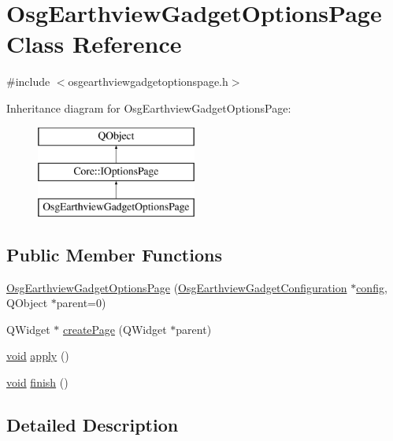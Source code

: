 \hypertarget{class_osg_earthview_gadget_options_page}{\section{Osg\-Earthview\-Gadget\-Options\-Page Class Reference}
\label{class_osg_earthview_gadget_options_page}
}


{\ttfamily \#include $<$osgearthviewgadgetoptionspage.\-h$>$}

Inheritance diagram for Osg\-Earthview\-Gadget\-Options\-Page\-:\begin{figure}[H]
\begin{center}
\leavevmode
\includegraphics[height=3.000000cm]{class_osg_earthview_gadget_options_page}
\end{center}
\end{figure}
\subsection*{Public Member Functions}
\begin{DoxyCompactItemize}
\item 
\hyperlink{group___o_p_map_plugin_gae7d8f2c382b21dd6d913abc3a5b3354a}{Osg\-Earthview\-Gadget\-Options\-Page} (\hyperlink{class_osg_earthview_gadget_configuration}{Osg\-Earthview\-Gadget\-Configuration} $\ast$\hyperlink{deflate_8c_a4473b5227787415097004fd39f55185e}{config}, Q\-Object $\ast$parent=0)
\item 
Q\-Widget $\ast$ \hyperlink{group___o_p_map_plugin_gab3f0d2eb9fbf4dca4dcdb6b20c70eb52}{create\-Page} (Q\-Widget $\ast$parent)
\item 
\hyperlink{group___u_a_v_objects_plugin_ga444cf2ff3f0ecbe028adce838d373f5c}{void} \hyperlink{group___o_p_map_plugin_ga1c8c1c8cba26cf60acc0c25bbd8b0d23}{apply} ()
\item 
\hyperlink{group___u_a_v_objects_plugin_ga444cf2ff3f0ecbe028adce838d373f5c}{void} \hyperlink{group___o_p_map_plugin_gaa2fbdbeced73248edc1b001ba9294684}{finish} ()
\end{DoxyCompactItemize}


\subsection{Detailed Description}


